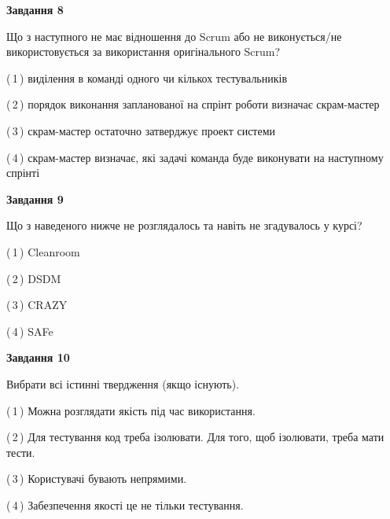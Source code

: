 \documentclass[10pt, ukrainian]{article}
\begin{document}
{\begin {large}
{\begin {center}\textbf{Завдання 8}\end {center}}\par
Що з наступного не має відношення до Scrum або не виконується/не використовується за використання оригінального Scrum?\par
\vspace{2mm}



(\,1\,) виділення в команді одного чи кількох тестувальників%



(\,2\,) порядок виконання запланованої на спрінт роботи визначає скрам-мастер%



(\,3\,) скрам-мастер остаточно затверджує проект системи%



(\,4\,) скрам-мастер визначає, які задачі команда буде виконувати на наступному спрінті%


{\begin {center}\textbf{Завдання 9}\end {center}}\par
Що з наведеного нижче не розглядалось та навіть не згадувалось у курсі?\par
\vspace{2mm}



(\,1\,) Cleanroom%



(\,2\,) DSDM%



(\,3\,) CRAZY%



(\,4\,) SAFe%


{\begin {center}\textbf{Завдання 10}\end {center}}\par
Вибрати всі істинні твердження (якщо існують).\par
\vspace{2mm}



(\,1\,) Можна розглядати якість під час використання.%



(\,2\,) Для тестування код треба ізолювати. Для того, щоб ізолювати, треба мати тести.%



(\,3\,) Користувачі бувають непрямими.%



(\,4\,) Забезпечення якості це не тільки тестування.%



\end {large}}
\end{document}
